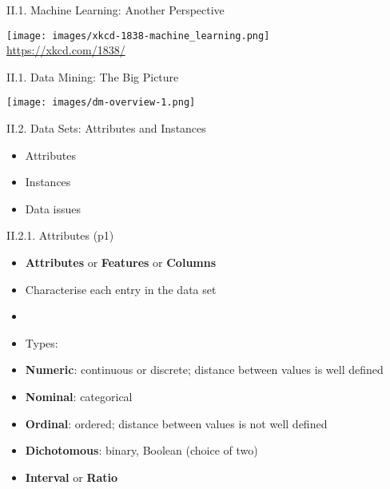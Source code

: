 \documentclass[handout]{beamer}
\newcommand{\strong}[1]{\textbf{\color{teal} #1}}
\newcommand{\stronger}[1]{\textbf{\color{purple} #1}}
\begin{document}
\begin{frame}{II.1. Machine Learning: Another Perspective}
\begin{center}
\texttt{[image: images/xkcd-1838-machine\_learning.png]}\\
{\footnotesize \url{https://xkcd.com/1838/}}
\end{center}
\end{frame}
\begin{frame}{II.1. Data Mining: The Big Picture}
\begin{center}
\texttt{[image: images/dm-overview-1.png]} 
\end{center}
\end{frame}
\begin{frame}{II.2. Data Sets: Attributes and Instances}
\begin{itemize}
\item[1.] Attributes
\item[2.] Instances
\item[3.] Data issues
\end{itemize}
\end{frame}
\begin{frame}{II.2.1. Attributes (p1)}
\begin{itemize}
\item \stronger{Attributes} or \stronger{Features} or \stronger{Columns}
\item Characterise each entry in the data set
\item[]
\item[] Types:
\item \strong{Numeric}: continuous or discrete; distance between values is well defined
\item \strong{Nominal}: categorical
\item \strong{Ordinal}: ordered; distance between values is not well defined
\item \strong{Dichotomous}: binary, Boolean (choice of two)
\item \strong{Interval} or \strong{Ratio}
\end{itemize}
\end{frame}
\end{document}
